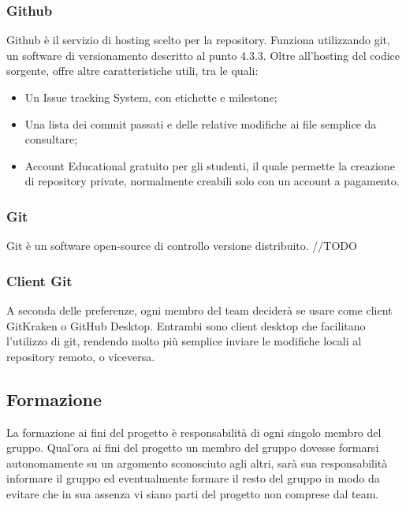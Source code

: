 \subsubsection{Github}
Github è il servizio di hosting scelto per la repository. Funziona utilizzando git, un software di versionamento descritto al punto 4.3.3. Oltre all'hosting del codice sorgente, offre altre caratteristiche utili, tra le quali:
\begin{itemize}  
\item Un Issue tracking System, con etichette e milestone;
\item Una lista dei commit passati e delle relative modifiche ai file semplice da consultare;
\item Account Educational gratuito per gli studenti, il quale permette la creazione di repository private, normalmente creabili solo con un account a pagamento.
\end{itemize}

\subsubsection{Git}
Git è un software open-source di controllo versione distribuito. 
//TODO

\subsubsection{Client Git}
A seconda delle preferenze, ogni membro del team deciderà se usare come client GitKraken o GitHub Desktop. Entrambi sono client desktop che facilitano l'utilizzo di git, rendendo molto più semplice inviare le modifiche locali al repository remoto, o viceversa.

\subsection{Formazione}
La formazione ai fini del progetto è responsabilità di ogni singolo membro del gruppo. Qual'ora ai fini del progetto un membro del gruppo dovesse formarsi autonomamente su un argomento sconosciuto agli altri, sarà sua responsabilità informare il gruppo ed eventualmente formare il resto del gruppo in modo da evitare che in sua assenza vi siano parti del progetto non comprese dal team.
\pagebreak